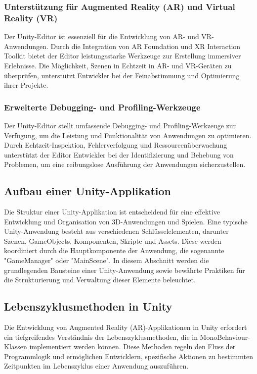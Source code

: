 \subsubsection{Unterstützung für Augmented Reality (AR) und Virtual Reality (VR)}
Der Unity-Editor ist essenziell für die Entwicklung von AR- und VR-Anwendungen. Durch die Integration von AR Foundation
und XR Interaction Toolkit bietet der Editor leistungsstarke Werkzeuge zur Erstellung immersiver Erlebnisse. Die
Möglichkeit, Szenen in Echtzeit in AR- und VR-Geräten zu überprüfen, unterstützt Entwickler bei der Feinabstimmung
und Optimierung ihrer Projekte.

\subsubsection{Erweiterte Debugging- und Profiling-Werkzeuge}
Der Unity-Editor stellt umfassende Debugging- und Profiling-Werkzeuge zur Verfügung, um die Leistung und Funktionalität
von Anwendungen zu optimieren. Durch Echtzeit-Inspektion, Fehlerverfolgung und Ressourcenüberwachung unterstützt der
Editor Entwickler bei der Identifizierung und Behebung von Problemen, um eine reibungslose Ausführung der Anwendungen
sicherzustellen.

\subsection{Aufbau einer Unity-Applikation}
Die Struktur einer Unity-Applikation ist entscheidend für eine effektive Entwicklung und Organisation von 3D-Anwendungen
und Spielen. Eine typische Unity-Anwendung besteht aus verschiedenen Schlüsselelementen, darunter Szenen, GameObjects,
Komponenten, Skripte und Assets. Diese werden koordiniert durch die Hauptkomponente der Anwendung, die sogenannte
"GameManager" oder "MainScene". In diesem Abschnitt werden die grundlegenden Bausteine einer Unity-Anwendung sowie
bewährte Praktiken für die Strukturierung und Verwaltung dieser Elemente beleuchtet.

\subsection{Lebenszyklusmethoden in Unity}
Die Entwicklung von Augmented Reality (AR)-Applikationen in Unity erfordert ein tiefgreifendes Verständnis der
Lebenszyklusmethoden, die in MonoBehaviour-Klassen implementiert werden können. Diese Methoden regeln den Fluss der
Programmlogik und ermöglichen Entwicklern, spezifische Aktionen zu bestimmten Zeitpunkten im Lebenszyklus einer
Anwendung auszuführen.

